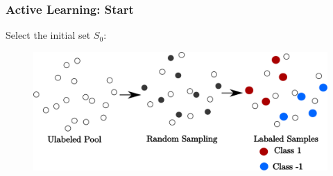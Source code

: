 \documentclass[11pts]{beamer}
\begin{document}
    



\begin{frame}%
\frametitle{Active Learning: Start}

Select the initial set $S_0$:

\begin{figure}
    \centering
    \includegraphics[scale=0.38]{IM/Dataset.pdf}

\end{figure}
\end{frame}
\end{document}
